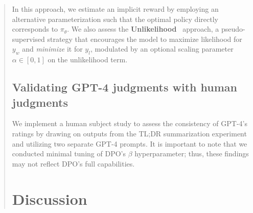 \begin{abstract}
\begin{sproof}
In this approach, we estimate an implicit reward by employing an alternative parameterization such that the optimal policy directly corresponds to $\pi_\theta$. We also assess the \textbf{Unlikelihood}~\citep{welleck2019neural} approach, a pseudo-supervised strategy that encourages the model to maximize likelihood for $y_w$ and \textit{minimize} it for $y_l$, modulated by an optional scaling parameter $\alpha\in[0,1]$ on the unlikelihood term. \subsection{Validating GPT-4 judgments with human judgments}
\label{sec:human-judgments}
We implement a human subject study to assess the consistency of GPT-4's ratings by drawing on outputs from the TL;DR summarization experiment and utilizing two separate GPT-4 prompts. It is important to note that we conducted minimal tuning of DPO's $\beta$ hyperparameter; thus, these findings may not reflect DPO’s full capabilities. \section{Discussion}

\end{sproof}
\end{abstract}
